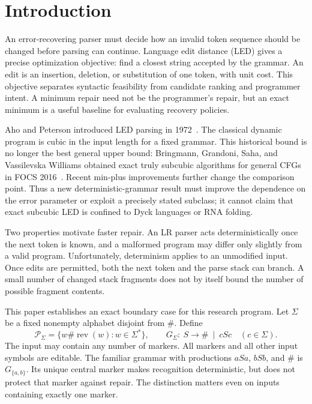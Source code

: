 \documentclass[sigconf,screen]{acmart}
\newcommand{\rev}{\operatorname{rev}}
\newcommand{\Pal}{\mathcal P}
\theoremstyle{definition}
\begin{document}
\section{Introduction}
An error-recovering parser must decide how an invalid token sequence should be changed before parsing can continue. Language edit distance (LED) gives a precise optimization objective: find a closest string accepted by the grammar. An edit is an insertion, deletion, or substitution of one token, with unit cost. This objective separates syntactic feasibility from candidate ranking and programmer intent. A minimum repair need not be the programmer's repair, but an exact minimum is a useful baseline for evaluating recovery policies.

Aho and Peterson introduced LED parsing in 1972~\cite{aho1972}. The classical dynamic program is cubic in the input length for a fixed grammar. This historical bound is no longer the best general upper bound: Bringmann, Grandoni, Saha, and Vassilevska Williams obtained exact truly subcubic algorithms for general CFGs in FOCS 2016~\cite{bgsv2019}. Recent min-plus improvements further change the comparison point. Thus a new deterministic-grammar result must improve the dependence on the error parameter or exploit a precisely stated subclass; it cannot claim that exact subcubic LED is confined to Dyck languages or RNA folding.

Two properties motivate faster repair. An LR parser acts deterministically once the next token is known, and a malformed program may differ only slightly from a valid program. Unfortunately, determinism applies to an unmodified input. Once edits are permitted, both the next token and the parse stack can branch. A small number of changed stack fragments does not by itself bound the number of possible fragment contents.

This paper establishes an exact boundary case for this research program. Let $\Sigma$ be a fixed nonempty alphabet disjoint from $\#$. Define
\begin{equation}\label{eq:language}
 \Pal_\Sigma=\{w\#\rev(w):w\in\Sigma^*\},\qquad
 G_\Sigma:\ S\to\#\ \mid\ cSc\quad(c\in\Sigma).
\end{equation}
The input may contain any number of markers. All markers and all other input symbols are editable. The familiar grammar with productions $aSa$, $bSb$, and $\#$ is $G_{\{a,b\}}$. Its unique central marker makes recognition deterministic, but does not protect that marker against repair. The distinction matters even on inputs containing exactly one marker.
\end{document}
